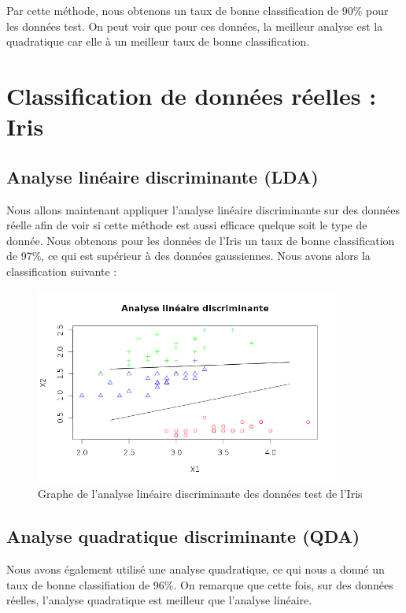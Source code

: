 \documentclass[a4paper,11pt]{article}
\begin{document}
  Par cette méthode, nous obtenons un taux de bonne classification de 90\% pour les données test.
  On peut voir que pour ces données, la meilleur analyse est la quadratique car elle à un meilleur
  taux de bonne classification.
  
  \section{Classification de données réelles : Iris}
  
  \subsection{Analyse linéaire discriminante (LDA)}
  
  Nous allons maintenant appliquer l'analyse linéaire discriminante sur des données réelle afin
  de voir si cette méthode est aussi efficace quelque soit le type de donnée. Nous obtenons pour les 
  données de l'Iris un taux de bonne classification de 97\%, ce qui est supérieur à des données 
  gaussiennes. Nous avons alors la classification suivante :\\
  \newpage
  \begin{figure}[h]
   \center
   \includegraphics[width=10cm]{iris_lineaire.png}
   \caption{Graphe de l'analyse linéaire discriminante des données test de l'Iris}
  \end{figure}
  
  \subsection{Analyse quadratique discriminante (QDA)}
  
  Nous avons également utilisé une analyse quadratique, ce qui nous a donné un taux de bonne 
  classifiation de 96\%. On remarque que cette fois, sur des données réelles, l'analyse quadratique
  est meilleur que l'analyse linéaire.
  
\end{document}

